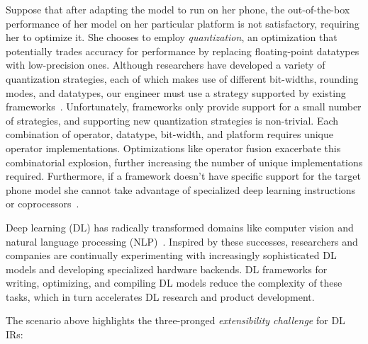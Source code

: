 Suppose that after adapting the model to run on her phone,
  the out-of-the-box performance of her
  model on her particular platform is not satisfactory, requiring her to optimize it.
She chooses to employ \textit{quantization}, an optimization that
  potentially trades accuracy for performance by replacing
  floating-point datatypes with low-precision ones.
Although researchers have developed a variety of quantization
  strategies, each of which makes use of different bit-widths, rounding
  modes, and datatypes, our engineer must use a strategy supported
  by existing frameworks~\citep{gustafson2015end, tf_lite_ops_compat, glow_quant}.
Unfortunately, frameworks only provide support for a small number
  of strategies, and supporting new quantization strategies is non-trivial.
Each combination of operator, datatype, bit-width, and
  platform requires unique operator implementations.
Optimizations like operator fusion exacerbate this combinatorial explosion,
  further increasing
  the number of unique implementations required.
Furthermore, if a framework doesn't have specific support for
  the target phone model she cannot take advantage of specialized deep learning
  instructions or coprocessors~\citep{apple_neural_engine}.

  Deep learning (DL) has radically transformed domains like
  computer vision and
  natural language processing (NLP)~\citep{yolo, recent_trends_in_nlp}.
Inspired by these successes,
  researchers and companies are continually
  experimenting with increasingly sophisticated DL models and
  developing specialized hardware backends.
DL frameworks for writing, optimizing, and compiling DL models
  reduce the complexity of these tasks,
  which in turn accelerates DL research and product development.

  The scenario above highlights the three-pronged \textit{extensibility challenge}
  for DL IRs:


